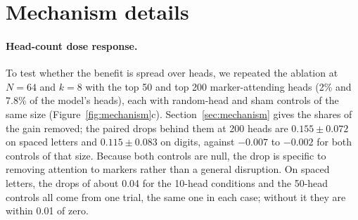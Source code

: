 \documentclass[10pt]{article} %
\begin{document}
\FloatBarrier
\section{Mechanism details}
\label{app:mechanism}

\paragraph{Head-count dose response.} To test whether the benefit is spread over heads, we repeated the ablation at $N = 64$ and $k = 8$ with the top 50 and top 200 marker-attending heads (2\% and 7.8\% of the model's heads), each with random-head and sham controls of the same size (Figure~\ref{fig:mechanism}c). Section~\ref{sec:mechanism} gives the shares of the gain removed; the paired drops behind them at 200 heads are $0.155 \pm 0.072$ on spaced letters and $0.115 \pm 0.083$ on digits, against $-0.007$ to $-0.002$ for both controls of that size. Because both controls are null, the drop is specific to removing attention to markers rather than a general disruption. On spaced letters, the drops of about 0.04 for the 10-head conditions and the 50-head controls all come from one trial, the same one in each case; without it they are within 0.01 of zero.
\end{document}
